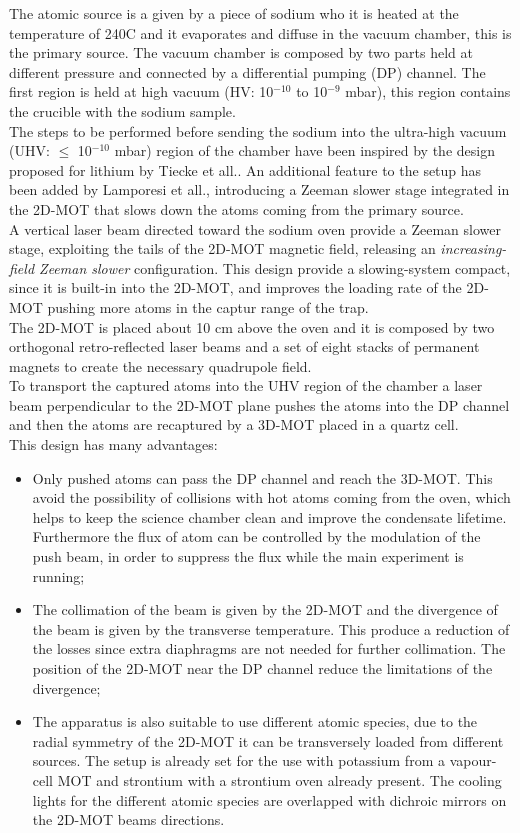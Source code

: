 \documentclass[../thesis.tex]{subfiles}
\begin{document}
The atomic source is a given by a piece of sodium who it is heated at the temperature of 240\degree C and it evaporates and diffuse in the vacuum chamber, this is the primary source. The vacuum chamber is composed by two parts held at different pressure and connected by a differential pumping (DP) channel. The first region is held at high vacuum (HV: 10$^{-10}$ to 10$^{-9}$ mbar), this region contains the crucible with the sodium sample.\\
The steps to be performed before sending the sodium into the ultra-high vacuum (UHV: $\leq$ 10$^{-10}$ mbar) region of the chamber have been inspired by the design proposed for lithium by Tiecke et all.\cite{Tiecke09}. An additional feature to the setup has been added by Lamporesi et all.\cite{Lamporesi13}, introducing a Zeeman slower stage integrated in the 2D-MOT that slows down the atoms coming from the primary source.\\
A vertical laser beam directed toward the sodium oven provide a Zeeman slower stage, exploiting the tails of the 2D-MOT magnetic field, releasing an \textit{increasing-field Zeeman slower} configuration. This design provide a slowing-system compact, since it is built-in into the 2D-MOT, and improves the loading rate of the 2D-MOT pushing more atoms in the captur range of the trap.\\
The 2D-MOT is placed about 10 cm above the oven and it is composed by two orthogonal retro-reflected laser beams and a set of eight stacks of permanent magnets to create the necessary quadrupole field.\\
To transport the captured atoms into the UHV region of the chamber a laser beam perpendicular to the 2D-MOT plane pushes the atoms into the DP channel and then the atoms are recaptured by a 3D-MOT placed in a quartz cell.\\

This design has many advantages:
\begin{itemize}
\item Only pushed atoms can pass the DP channel and reach the 3D-MOT. This avoid the possibility of collisions with hot atoms coming from the oven, which helps to keep the science chamber clean and improve the condensate lifetime. Furthermore the flux of atom can be controlled by the modulation of the push beam, in order to suppress the flux while the main experiment is running;
\item The collimation of the beam is given by the 2D-MOT and the divergence of the beam is given by the transverse temperature. This produce a reduction of the losses since extra diaphragms are not needed for further collimation. The position of the 2D-MOT near the DP channel reduce the limitations of the divergence;
\item The apparatus is also suitable to use different atomic species, due to the radial symmetry of the 2D-MOT it can be transversely loaded from different sources. The setup is already set for the use with potassium from a vapour-cell MOT and strontium with a strontium oven already present. The cooling lights for the different atomic species are overlapped with dichroic mirrors on the 2D-MOT beams directions. 
\end{itemize}
\end{document}
